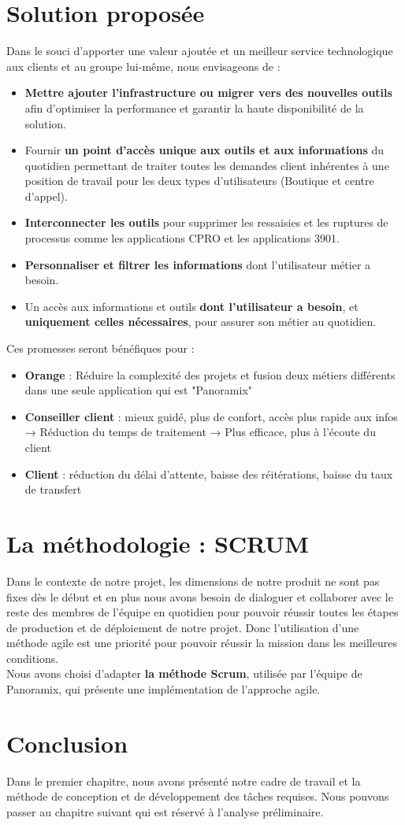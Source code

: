 \section[Solution proposée]{Solution proposée}
Dans le souci d’apporter une valeur ajoutée et un meilleur service technologique aux clients et au groupe lui-même, nous envisageons de :
\begin{itemize}
	\item \textbf{Mettre ajouter l'infrastructure ou migrer vers des nouvelles outils} afin d'optimiser la performance et garantir la haute disponibilité de la solution.
	\item Fournir \textbf{un point d’accès unique aux outils et aux informations} du quotidien permettant de traiter toutes les demandes client inhérentes à une position de travail pour les deux types d'utilisateurs (Boutique et centre d’appel).
	\item \textbf{Interconnecter les outils} pour supprimer les ressaisies et les ruptures de processus comme les applications CPRO et les applications 3901.
	\item \textbf{Personnaliser et filtrer les informations} dont l’utilisateur métier a besoin.
	\item Un accès aux informations et outils \textbf{dont l’utilisateur a besoin}, et \textbf{uniquement celles nécessaires}, pour assurer son métier au quotidien.
	
\end{itemize}
Ces promesses seront bénéfiques pour :
\begin{itemize}
	\item \textbf{Orange} : Réduire la complexité des projets et fusion deux métiers différents dans une seule application qui est "Panoramix"
	\item \textbf{Conseiller client } : mieux guidé, plus de confort, accès plus rapide aux infos
	\subitem → Réduction du temps  de traitement
	\subitem → Plus efficace, plus à l’écoute du client
	\item \textbf{Client} : réduction du délai d’attente, baisse des réitérations, baisse du taux de transfert
\end{itemize}
\section[La méthodologie : SCRUM]{La méthodologie : SCRUM}
Dans le contexte de notre projet, les dimensions de notre produit ne sont pas fixes dès le début et en plus nous avons besoin de dialoguer  et collaborer avec le reste des membres de l’équipe en quotidien pour pouvoir réussir toutes les étapes de production et de déploiement de notre projet. Donc l’utilisation d’une méthode agile est une priorité pour pouvoir réussir la mission dans les meilleures conditions. 
\\
Nous avons choisi d’adapter \textbf{la méthode Scrum}, utilisée par l’équipe de Panoramix, qui présente une implémentation de l’approche agile.
\section*{Conclusion}
Dans le premier chapitre, nous avons présenté notre cadre de travail et la méthode de conception et de développement des tâches requises. Nous pouvons passer au chapitre suivant qui est réservé à l’analyse préliminaire.
